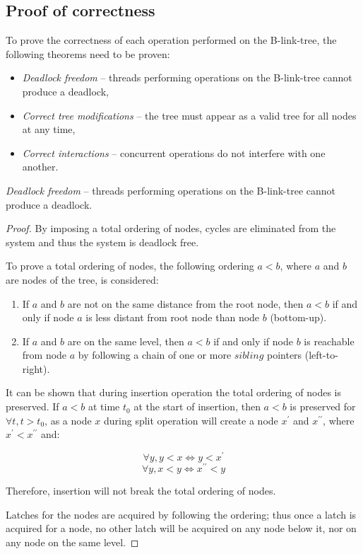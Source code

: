 \subsection{Proof of correctness}

To prove the correctness of each operation performed on the B-link-tree, the following theorems need to be proven:

\begin{itemize}
  \item \textit{Deadlock freedom} -- threads performing operations on the B-link-tree cannot produce a deadlock,
  \item \textit{Correct tree modifications} -- the tree must appear as a valid tree for all nodes at any time,
  \item \textit{Correct interactions} -- concurrent operations do not interfere with one another.
\end{itemize}

\begin{theorem}
  \textit{Deadlock freedom} -- threads performing operations on the B-link-tree cannot produce a deadlock.
\end{theorem}

\begin{proof}
  By imposing a total ordering of nodes, cycles are eliminated from the system and thus the system is deadlock free.

  To prove a total ordering of nodes, the following ordering $a < b$, where $a$ and $b$ are nodes of the tree, is considered:

  \begin{enumerate}
    \item If $a$ and $b$ are not on the same distance from the root node, then $a < b$ if and only if node $a$ is less distant from root node than node $b$ (bottom-up).
    \item If $a$ and $b$ are on the same level, then $a < b$ if and only if node $b$ is reachable from node $a$ by following a chain of one or more $sibling$ pointers (left-to-right).
  \end{enumerate}

  It can be shown that during insertion operation the total ordering of nodes is preserved. If $a < b$ at time $t_0$ at the start of insertion, then $a < b$ is preserved for $\forall t, t > t_0$, as a node $x$ during split operation will create a node $x^\prime$ and $x^{\prime\prime}$, where $x^\prime < x^{\prime\prime}$ and:

  $$\forall y, y < x \Leftrightarrow y < x^\prime$$
  $$\forall y, x < y \Leftrightarrow x^{\prime\prime} < y$$

  Therefore, insertion will not break the total ordering of nodes.

  Latches for the nodes are acquired by following the ordering; thus once a latch is acquired for a node, no other latch will be acquired on any node below it, nor on any node on the same level.
\end{proof}

